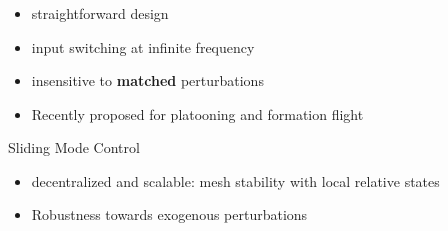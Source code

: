 \documentclass[12pt,svgnames,table,draft=false]{beamer}
\begin{document}

\begin{frame}\frametitle{}
\centering

\begin{tcolorbox}[colback=blue!5!white,colframe=blue!75!black,title=Ideal Sliding Mode Control, width=20em,
standard jigsaw,
opacityback=.7]
\begin{itemize}
\item straightforward design
\item input switching at infinite frequency
\item insensitive to \textbf{matched} perturbations
\item Recently proposed for platooning \cite{Fahimi2007} and formation flight \cite{galzi2006uav}
\end{itemize}
\end{tcolorbox}

\end{frame}


\usebackgroundtemplate{}
\begin{frame}{Sliding Mode Control}
\centering

\begin{tcolorbox}[colback=blue!5!white,colframe=blue!75!black,title=Potential Benefits, width=20em,
standard jigsaw,
opacityback=.7]
\begin{itemize}
\item decentralized and scalable: mesh stability with local relative states
\item Robustness towards exogenous perturbations
\end{itemize}
\end{tcolorbox}
\end{frame}
\end{document}
